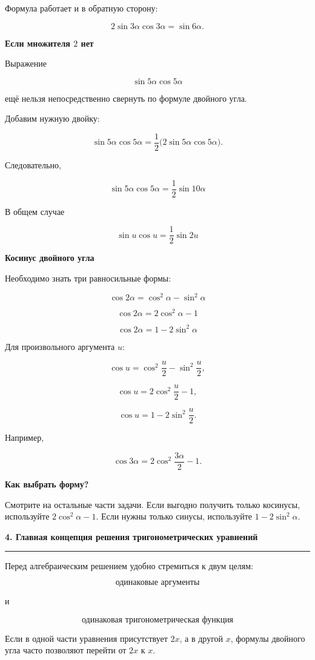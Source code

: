 \documentclass[a4paper,12pt]{article}
\newcommand{\maintitle}[1]{%
  {\Large\bfseries\color{darkaccent}#1\par}
  \vspace{0.5em}
  {\color{accent}\rule{\linewidth}{0.7pt}\par}
  \vspace{0.8em}
}
\newcommand{\subheading}[1]{%
  \vspace{0.7em}
  {\large\bfseries\color{darkaccent}#1\par}
  \vspace{0.25em}
}
\newcommand{\important}[1]{%
  \par\noindent
  {\bfseries\color{darkaccent}#1}
}
\begin{document}
Формула работает и в обратную сторону:

\[
2\sin3\alpha\cos3\alpha
=
\sin6\alpha.
\]

\subheading{Если множителя \(2\) нет}

Выражение

\[
\sin5\alpha\cos5\alpha
\]

ещё нельзя непосредственно свернуть по формуле двойного угла.

Добавим нужную двойку:

\[
\sin5\alpha\cos5\alpha
=
\frac12
\bigl(
2\sin5\alpha\cos5\alpha
\bigr).
\]

Следовательно,

\[
\boxed{
\sin5\alpha\cos5\alpha
=
\frac12\sin10\alpha
}
\]

В общем случае

\[
\boxed{
\sin u\cos u=\frac12\sin2u
}
\]

\subheading{Косинус двойного угла}

Необходимо знать три равносильные формы:

\[
\boxed{
\cos2\alpha
=
\cos^2\alpha-\sin^2\alpha
}
\]

\[
\boxed{
\cos2\alpha
=
2\cos^2\alpha-1
}
\]

\[
\boxed{
\cos2\alpha
=
1-2\sin^2\alpha
}
\]

Для произвольного аргумента \(u\):

\[
\cos u
=
\cos^2\frac{u}{2}
-
\sin^2\frac{u}{2},
\]

\[
\cos u
=
2\cos^2\frac{u}{2}-1,
\]

\[
\cos u
=
1-2\sin^2\frac{u}{2}.
\]

Например,

\[
\cos3\alpha
=
2\cos^2\frac{3\alpha}{2}-1.
\]

\important{Как выбрать форму?}
Смотрите на остальные части задачи.
Если выгодно получить только косинусы, используйте
\(2\cos^2\alpha-1\).
Если нужны только синусы, используйте
\(1-2\sin^2\alpha\).

\maintitle{4. Главная концепция решения тригонометрических уравнений}

Перед алгебраическим решением удобно стремиться к двум целям:

\[
\boxed{\text{одинаковые аргументы}}
\]

и

\[
\boxed{\text{одинаковая тригонометрическая функция}}
\]

Если в одной части уравнения присутствует \(2x\), а в другой \(x\),
формулы двойного угла часто позволяют перейти от \(2x\) к \(x\).
\end{document}
